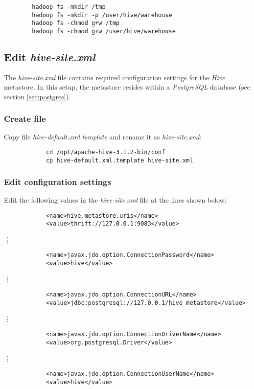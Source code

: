 \documentclass{article}
\begin{document}
    \begin{verbatim}
        hadoop fs -mkdir /tmp 
        hadoop fs -mkdir -p /user/hive/warehouse 
        hadoop fs -chmod g+w /tmp 
        hadoop fs -chmod g+w /user/hive/warehouse
    \end{verbatim}

    \subsection{Edit \emph{hive-site.xml}}
    The \emph{hive-site.xml} file contains required configuration settings for the \emph{Hive} metastore.
    In this setup, the metastore resides within a \emph{PostgreSQL} database (see section \ref{sec:postgres}).

        \subsubsection{Create file}
        Copy file \emph{hive-default.xml.template} and rename it as \emph{hive-site.xml}:
        \begin{verbatim}
            cd /opt/apache-hive-3.1.2-bin/conf
            cp hive-default.xml.template hive-site.xml
        \end{verbatim}

        \subsubsection{Edit configuration settings}
        Edit the following values in the \emph{hive-site.xml} file at the lines shown below:
        \begin{verbatim}
            <name>hive.metastore.uris</name>
            <value>thrift://127.0.0.1:9083</value>
        \end{verbatim}
        \centerline{\vdots}
        \begin{verbatim}
            <name>javax.jdo.option.ConnectionPassword</name>
            <value>hive</value>
        \end{verbatim}
        \centerline{\vdots}
        \begin{verbatim}
            <name>javax.jdo.option.ConnectionURL</name>
            <value>jdbc:postgresql://127.0.0.1/hive_metastore</value>
        \end{verbatim}
        \centerline{\vdots}
        \begin{verbatim}
            <name>javax.jdo.option.ConnectionDriverName</name>
            <value>org.postgresql.Driver</value>
        \end{verbatim}
        \centerline{\vdots}
        \begin{verbatim}
            <name>javax.jdo.option.ConnectionUserName</name>
            <value>hive</value>
        \end{verbatim}
\end{document}
